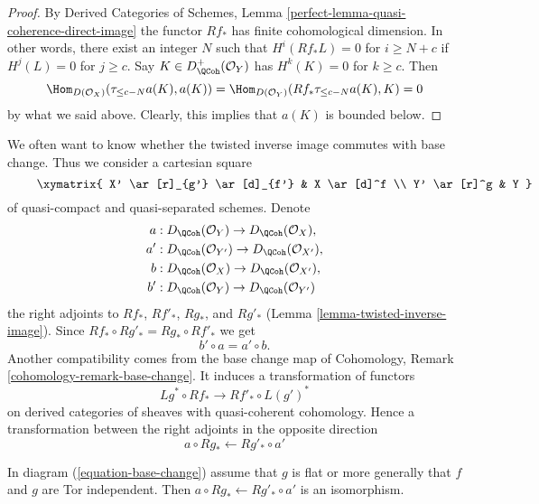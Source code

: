 \begin{proof}
By Derived Categories of Schemes, Lemma
\ref{perfect-lemma-quasi-coherence-direct-image}
the functor $Rf_*$ has finite cohomological dimension. In other words,
there exist an integer $N$ such that
$H^i(Rf_*L) = 0$ for $i \geq N + c$ if $H^j(L) = 0$ for $j \geq c$.
Say $K \in D^+_\QCoh(\mathcal{O}_Y)$ has $H^k(K) = 0$ for $k \geq c$.
Then
$$
\Hom_{D(\mathcal{O}_X)}(\tau_{\leq c - N}a(K), a(K)) =
\Hom_{D(\mathcal{O}_Y)}(Rf_*\tau_{\leq c - N}a(K), K) = 0
$$
by what we said above. Clearly, this implies that $a(K)$ is bounded below.
\end{proof}

\noindent
We often want to know whether the twisted inverse image commutes
with base change. Thus we consider a cartesian square
\begin{equation}
\label{equation-base-change}
\vcenter{
\xymatrix{
X' \ar[r]_{g'} \ar[d]_{f'} & X \ar[d]^f \\
Y' \ar[r]^g & Y
}
}
\end{equation}
of quasi-compact and quasi-separated schemes.
Denote
\begin{align*}
a  & : D_\QCoh(\mathcal{O}_Y) \to D_\QCoh(\mathcal{O}_X), \\
a' & : D_\QCoh(\mathcal{O}_{Y'}) \to D_\QCoh(\mathcal{O}_{X'}), \\
b  & : D_\QCoh(\mathcal{O}_X) \to D_\QCoh(\mathcal{O}_{X'}), \\
b' & : D_\QCoh(\mathcal{O}_Y) \to D_\QCoh(\mathcal{O}_{Y'})
\end{align*}
the right adjoints to $Rf_*$, $Rf'_*$, $Rg_*$, and $Rg'_*$
(Lemma \ref{lemma-twisted-inverse-image}). Since
$Rf_* \circ Rg'_* = Rg_* \circ Rf'_*$ we get
$$
b' \circ a = a' \circ b.
$$
Another compatibility comes from the base change map of
Cohomology, Remark \ref{cohomology-remark-base-change}.
It induces a transformation of functors
$$
Lg^* \circ Rf_* \longrightarrow Rf'_* \circ L(g')^*
$$
on derived categories of sheaves with quasi-coherent cohomology.
Hence a transformation between the right adjoints in the opposite direction
$$
a \circ Rg_* \longleftarrow Rg'_* \circ a'
$$

\begin{lemma}
\label{lemma-flat-precompose-pus}
In diagram (\ref{equation-base-change}) assume that $g$ is flat or
more generally that $f$ and $g$ are Tor independent. Then
$a \circ Rg_* \longleftarrow Rg'_* \circ a'$ is an isomorphism.
\end{lemma}

